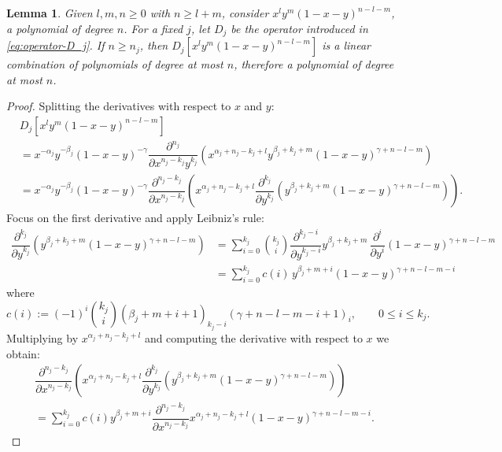 \documentclass[11pt,reqno]{amsart}
\newtheorem{lemma}[theorem]{Lemma}
\theoremstyle{definition}
\begin{document}
\begin{lemma}
    \label{lemma:operator-degree}
    Given $l,m,n\geq0$ with $n\geq l+m$, consider $x^l y^m (1-x-y)^{n-l-m}$, a polynomial of degree $n$. For a fixed $j$, let $D_j$ be the operator introduced in \eqref{eq:operator-D_j}. If $n\ge n_j$, then $D_j[x^l y^m (1-x-y)^{n-l-m}]$ is a linear combination of polynomials of degree at most $n$, therefore a polynomial of degree at most $n$.
\end{lemma}
\begin{proof}
    Splitting the derivatives with respect to $x$ and $y$:
    $$
    \begin{aligned}
        &D_j[x^l y^m(1-x-y)^{n-l-m}]\\ &= x^{-\alpha_j}y^{-\beta_j}(1-x-y)^{-\gamma}\dfrac{\partial^{n_j}}{\partial x^{n_j-k_j}y^{k_j}}\left( x^{\alpha_j+n_j-k_j+l} y^{\beta_j+k_j+m} (1-x-y)^{\gamma+n-l-m}\right) \\ & =
    x^{-\alpha_j}y^{-\beta_j}(1-x-y)^{-\gamma}\dfrac{\partial^{n_j-k_j}}{\partial x^{n_j-k_j}}\left(x^{\alpha_j+n_j-k_j+l}\dfrac{\partial^{k_j}}{\partial y^{k_j}} (y^{\beta_j+k_j+m} (1-x-y)^{\gamma+n-l-m})\right).
    \end{aligned}
    $$
    Focus on the first derivative and apply Leibniz's rule:
    \begin{equation}
        \begin{aligned}
            \dfrac{\partial^{k_j}}{\partial y^{k_j}} (y^{\beta_j+k_j+m} (1-x-y)^{\gamma+n-l-m}) &= \sum_{i=0}^{k_j}\binom{k_j}{i} \dfrac{\partial^{k_j-i}}{\partial y^{k_j-i}}y^{\beta_j+k_j+m} \, \dfrac{\partial^{i}}{\partial y^{i}}(1-x-y)^{\gamma+n-l-m} \\ &=\sum_{i=0}^{k_j}c(i)\, y^{\beta_j+m+i}(1-x-y)^{\gamma+n-l-m-i}
        \end{aligned}
    \end{equation}
    where 
    \begin{equation}
        \label{eq:coef-c-1}
        c(i):=(-1)^i\binom{k_j}{i}(\beta_j+m+i+1)_{k_j-i}(\gamma+n-l-m-i+1)_i, \qquad 0\leq i\leq k_j.
    \end{equation}
    Multiplying by $x^{\alpha_j+n_j-k_j+l}$ and computing the derivative with respect to $x$ we obtain:
    \begin{multline*}
        \dfrac{\partial^{n_j-k_j}}{\partial x^{n_j-k_j}}\left(x^{\alpha_j+n_j-k_j+l}\dfrac{\partial^{k_j}}{\partial y^{k_j}} (y^{\beta_j+k_j+m} (1-x-y)^{\gamma+n-l-m})\right) \\ =\sum_{i=0}^{k_j}c(i)  y^{\beta_j+m+i}\dfrac{\partial^{n_j-k_j}}{\partial x^{n_j-k_j}}x^{\alpha_j+n_j-k_j+l}(1-x-y)^{\gamma+n-l-m-i}.

\end{multline*}
\end{proof}
\end{document}
